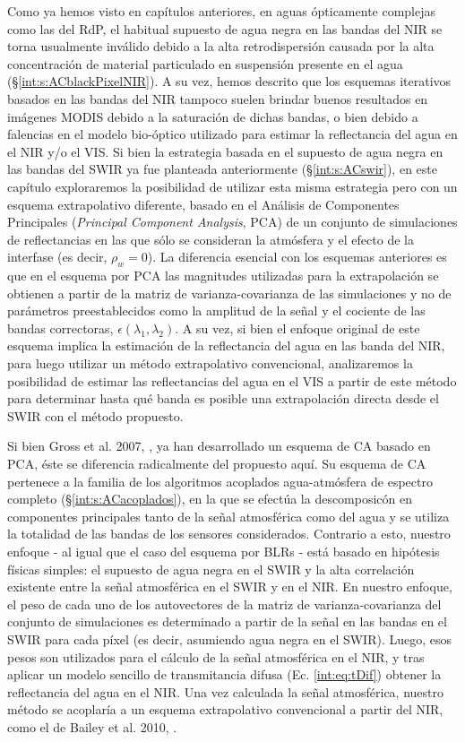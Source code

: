     Como ya hemos visto en capítulos anteriores, en aguas ópticamente complejas como las del RdP, el habitual supuesto de agua negra en las bandas del NIR se torna usualmente inválido debido a la alta retrodispersión causada por la alta concentración de material particulado en suspensión presente en el agua (\S \ref{int:s:ACblackPixelNIR}). A su vez, hemos descrito que los esquemas iterativos basados en las bandas del NIR tampoco suelen brindar buenos resultados en imágenes MODIS debido a la saturación de dichas bandas, o bien debido a falencias en el modelo bio-óptico utilizado para estimar la reflectancia del agua en el NIR y/o el VIS. Si bien la estrategia basada en el supuesto de agua negra en las bandas del SWIR ya fue planteada anteriormente (\S \ref{int:s:ACswir}), en este capítulo exploraremos la posibilidad de utilizar esta misma estrategia pero con un esquema extrapolativo diferente, basado en el Análisis de Componentes Principales (\textit{Principal Component Analysis}, PCA) de un conjunto de simulaciones de reflectancias en las que sólo se consideran la atmósfera y el efecto de la interfase (es decir, $\rho_{w}=0$). La diferencia esencial con los esquemas anteriores es que en el esquema por PCA las magnitudes utilizadas para la extrapolación se obtienen a partir de la matriz de varianza-covarianza de las simulaciones y no de parámetros preestablecidos como la amplitud de la señal y el cociente de las bandas correctoras, $\epsilon(\lambda_{1},\lambda_{2})$. A su vez, si bien el enfoque original de este esquema implica la estimación de la reflectancia del agua en las banda del NIR, para luego utilizar un método extrapolativo convencional, analizaremos la posibilidad de estimar las reflectancias del agua en el VIS a partir de este método para determinar hasta qué banda es posible una extrapolación directa desde el SWIR con el método propuesto.

    Si bien Gross et al. 2007, \cite{gross2007}, ya han desarrollado un esquema de CA basado en PCA, éste se diferencia radicalmente del propuesto aquí. Su esquema de CA pertenece a la familia de los algoritmos acoplados agua-atmósfera de espectro completo (\S \ref{int:s:ACacoplados}), en la que se efectúa la descomposicón en componentes principales tanto de la señal atmosférica como del agua y se utiliza la totalidad de las bandas de los sensores considerados. Contrario a esto, nuestro enfoque - al igual que el caso del esquema por BLRs - está basado en hipótesis físicas simples: el supuesto de agua negra en el SWIR y la alta correlación existente entre la señal atmosférica en el SWIR y en el NIR.
    En nuestro enfoque, el peso de cada uno de los autovectores de la matriz de varianza-covarianza del conjunto de simulaciones es determinado a partir de la señal en las bandas en el SWIR para cada píxel (es decir, asumiendo agua negra en el SWIR). Luego, esos pesos son utilizados para el cálculo de la señal atmosférica en el NIR, y tras aplicar un modelo sencillo de transmitancia difusa (Ec. \ref{int:eq:tDif}) obtener la reflectancia del agua en el NIR. Una vez calculada la señal atmosférica, nuestro método se acoplaría a un esquema extrapolativo convencional a partir del NIR, como el de Bailey et al. 2010, \cite{bailey2010}.
    
